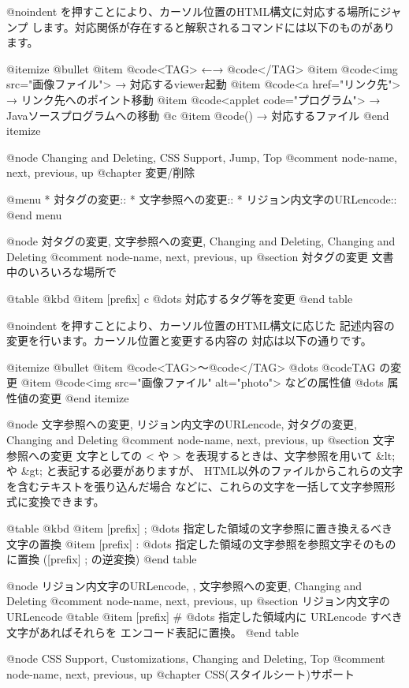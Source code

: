 @noindent 
を押すことにより、カーソル位置のHTML構文に対応する場所にジャンプ
します。対応関係が存在すると解釈されるコマンドには以下のものがあります。

@itemize @bullet
@item @code{<TAG>} ←→ @code{</TAG>}
@item @code{<img src="画像ファイル">} → 対応するviewer起動
@item @code{<a href="リンク先">} → リンク先へのポイント移動
@item @code{<applet code="プログラム">} → Javaソースプログラムへの移動
@c @item @code{()} → 対応するファイル
@end itemize

@node Changing and Deleting, CSS Support, Jump, Top
@comment  node-name,  next,  previous,  up
@chapter 変更/削除

@menu
* 対タグの変更::                
* 文字参照への変更::            
* リジョン内文字のURLencode::   
@end menu

@node 対タグの変更, 文字参照への変更, Changing and Deleting, Changing and Deleting
@comment  node-name,  next,  previous,  up
@section 対タグの変更
文書中のいろいろな場所で

@table @kbd
@item [prefix] c
        @dots{} 対応するタグ等を変更
@end table

@noindent 
を押すことにより、カーソル位置のHTML構文に応じた
記述内容の変更を行います。カーソル位置と変更する内容の
対応は以下の通りです。

@itemize @bullet
@item @code{<TAG>}〜@code{</TAG>}
@dots{} @code{TAG} の変更
@item @code{<img src="画像ファイル" alt="photo">} などの属性値
@dots{} 属性値の変更
@end itemize

@node 文字参照への変更, リジョン内文字のURLencode, 対タグの変更, Changing and Deleting
@comment  node-name,  next,  previous,  up
@section 文字参照への変更
文字としての < や > を表現するときは、文字参照を用いて
&lt; や &gt; と表記する必要がありますが、
HTML以外のファイルからこれらの文字を含むテキストを張り込んだ場合
などに、これらの文字を一括して文字参照形式に変換できます。

@table @kbd
@item [prefix] ;
        @dots{} 指定した領域の文字参照に置き換えるべき文字の置換
@item [prefix] :
        @dots{} 指定した領域の文字参照を参照文字そのものに置換
        ([prefix] ; の逆変換)
@end table


@node リジョン内文字のURLencode,  , 文字参照への変更, Changing and Deleting
@comment  node-name,  next,  previous,  up
@section リジョン内文字のURLencode
@table
 @item [prefix] #
	@dots{} 指定した領域内に URLencode すべき文字があればそれらを
        エンコード表記に置換。
@end table

@node CSS Support, Customizations, Changing and Deleting, Top
@comment  node-name,  next,  previous,  up
@chapter CSS(スタイルシート)サポート

